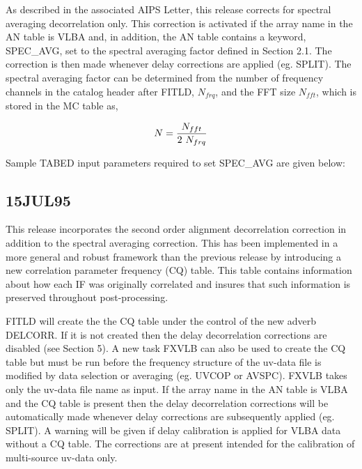 As described in the associated AIPS Letter, this release corrects for
spectral averaging decorrelation only. This correction is activated if
the array name in the AN table is VLBA and, in addition, the AN
table contains a keyword, SPEC\_AVG, set to the spectral
averaging factor defined in Section 2.1. The correction is then made
whenever delay corrections are applied (eg. SPLIT). The spectral
averaging factor can be determined from the number of frequency
channels in the catalog header after FITLD, $N_{frq}$, and the FFT
size $N_{fft}$, which is stored in the MC table as,

$$N = {{N_{fft}} \over {2\ N_{frq}}}$$

Sample TABED input parameters required to set SPEC\_AVG are given
below:


\subsection{15JUL95}

This release incorporates the second order alignment decorrelation
correction in addition to the spectral averaging correction. This has
been implemented in a more general and robust framework than the
previous release by introducing a new correlation parameter frequency
(CQ) table. This table contains information about how each IF was
originally correlated and insures that such information is preserved
throughout post-processing.

FITLD will create the the CQ table under the control of the new adverb
DELCORR. If it is not created then the delay decorrelation corrections
are disabled (see Section 5).  A new task FXVLB can also be used to
create the CQ table but must be run before the frequency structure of
the uv-data file is modified by data selection or averaging (eg. UVCOP
or AVSPC). FXVLB takes only the uv-data file name as input. If the
array name in the AN table is VLBA and the CQ table is present then
the delay decorrelation corrections will be automatically made
whenever delay corrections are subsequently applied (eg. SPLIT). A
warning will be given if delay calibration is applied for VLBA data
without a CQ table. The corrections are at present intended for the
calibration of multi-source uv-data only.

